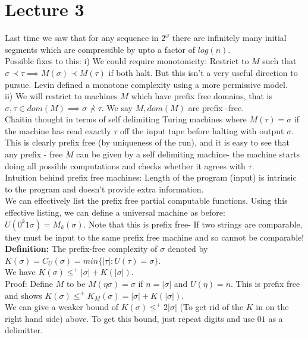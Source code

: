 \documentclass{article}
\begin{document}
	\section{Lecture 3}
	Last time we saw that for any sequence in $2^\omega$ there are infinitely many initial segments which are compressible by upto a factor of $log(n)$.\\
	Possible fixes to this: i) We could require monotonicity: Restrict to $M$ such that $\sigma \prec \tau \implies M(\sigma) \prec M(\tau)$ if both halt. But this isn't a very useful direction to pursue. Levin defined a monotone complexity using a more permissive model.\\
	ii) We will restrict to machines $M$ which have prefix free domains, that is $\sigma, \tau \in dom(M) \implies \sigma \not \prec \tau$. We say $M, dom(M)$ are prefix -free.\\
	Chaitin thought in terms of self delimiting Turing machines where $M(\tau) = \sigma$ if the machine has read exactly $\tau$ off the input tape before halting with output $\sigma$. This is clearly prefix free (by uniqueness of the run), and it is easy to see that any prefix - free $M$ can be given by a self delimiting machine- the machine starts doing all possible computations and checks whether it agrees with $\tau$.\\
	Intuition behind prefix free machines: Length of the program (input) is intrinsic to the program and doesn't provide extra information.\\
	We can effectively list the prefix free partial computable functions. Using this effective listing, we can define a universal machine as before: $U(0^k 1 \sigma) = M_k(\sigma)$. Note that this is prefix free- If two strings are comparable, they must be input to the same prefix free machine and so cannot be comparable!\\
	\textbf{Definition:} The prefix-free complexity of $\sigma$ denoted by $K(\sigma) = C_U(\sigma)= min \{|\tau| : U(\tau) = \sigma\}$.\\
	We have $K(\sigma) \leq^+ |\sigma| + K(|\sigma|)$.\\
	Proof: Define $M$ to be $M(\eta \sigma) = \sigma$ if $n = |\sigma|$ and $U(\eta)= n$. This is prefix free and shows $K(\sigma) \leq^+ K_M(\sigma) = |\sigma| + K(|\sigma|)$.\\
	We can give a weaker bound of $K(\sigma) \leq^+ 2 |\sigma|$ (To get rid of the $K$ in on the right hand side) above. To get this bound, just repeat digits and use $01$ as a delimitter.\\
\end{document}
